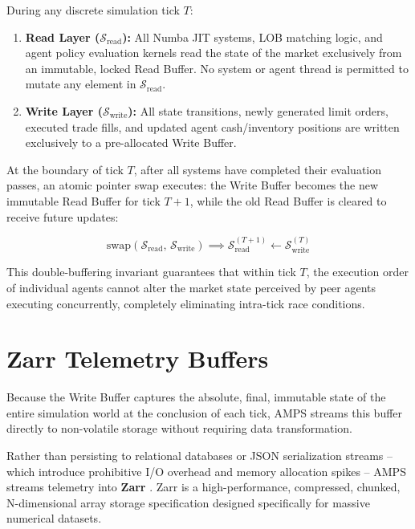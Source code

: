 During any discrete simulation tick $T$:
\begin{enumerate}
    \item \textbf{Read Layer ($\mathcal{S}_{\text{read}}$):} All Numba JIT systems, LOB matching logic, and agent policy evaluation kernels read the state of the market exclusively from an immutable, locked Read Buffer. No system or agent thread is permitted to mutate any element in $\mathcal{S}_{\text{read}}$.
    \item \textbf{Write Layer ($\mathcal{S}_{\text{write}}$):} All state transitions, newly generated limit orders, executed trade fills, and updated agent cash/inventory positions are written exclusively to a pre-allocated Write Buffer.
\end{enumerate}

At the boundary of tick $T$, after all systems have completed their evaluation passes, an atomic pointer swap executes: the Write Buffer becomes the new immutable Read Buffer for tick $T+1$, while the old Read Buffer is cleared to receive future updates:

\begin{equation}
    \text{swap}(\mathcal{S}_{\text{read}}, \, \mathcal{S}_{\text{write}}) \implies \mathcal{S}_{\text{read}}^{(T+1)} \leftarrow \mathcal{S}_{\text{write}}^{(T)}
\end{equation}

This double-buffering invariant guarantees that within tick $T$, the execution order of individual agents cannot alter the market state perceived by peer agents executing concurrently, completely eliminating intra-tick race conditions.

\section{Zarr Telemetry Buffers}

Because the Write Buffer captures the absolute, final, immutable state of the entire simulation world at the conclusion of each tick, AMPS streams this buffer directly to non-volatile storage without requiring data transformation.

Rather than persisting to relational databases or JSON serialization streams -- which introduce prohibitive I/O overhead and memory allocation spikes -- AMPS streams telemetry into \textbf{Zarr} \cite{zarr2023dev}. Zarr is a high-performance, compressed, chunked, N-dimensional array storage specification designed specifically for massive numerical datasets.

